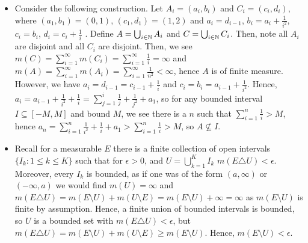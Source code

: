 \documentclass[a4paper]{article}
\begin{document}
\begin{solution}[27]
\begin{itemize}
	\item Consider the following construction. Let \(A_{i} = \left( a_{i}, b_{i} \right) \) and \(C_{i} = \left( c_{i}, d_{i}  \right) \), where \(\left( a_1, b_1 \right)  = \left( 0, 1 \right) \), \(\left( c_1, d_1 \right) = \left( 1, 2 \right) \)  and \(a_{i} = d_{i-1}\), \(b_{i} = a_{i} + \frac{1}{i^2}\),  \(c_{i} = b_{i}\), \(d_{i} = c_{i} + \frac{1}{i}\) . Define \(A = \bigcup_{i \in \mathbb{N}} A_{i}\) and \(C = \bigcup_{i \in \mathbb{N}} C_{i}\). Then, note all \(A_{i}\) are disjoint and all \(C_{i}\) are disjoint. Then, we see \(m\left( C \right)  = \sum_{i= 1}^{\infty} m\left( C_{i} \right) = \sum_{i= 1}^{\infty} \frac{1}{i} = \infty \) and \(m\left( A \right)  = \sum_{i= 1}^{\infty} m\left( A_{i} \right) = \sum_{i= 1}^{\infty} \frac{1}{n^2} < \infty \), hence \(A\) is of finite measure. However, we have \(a_{i} = d_{i-1} = c_{i-1} + \frac{1}{i}\) and \(c_{i} = b_{i} = a_{i-1} + \frac{1}{i^2} \). Hence, \(a_{i} = a_{i-1} + \frac{1}{i^2} + \frac{1}{i} = \sum_{j= 1}^{i}\frac{1}{j} + \frac{1}{j^2} + a_1\), so for any bounded interval \(I \subseteq \left[ -M, M \right] \) and bound \(M\), we see there is a \(n\) such that \(\sum_{i= 1}^{n} \frac{1}{i} > M\), hence \( a_{n} = \sum_{i= 1}^{n} \frac{1}{i^2} + \frac{1}{i} + a_1 > \sum_{i= 1}^{n} \frac{1}{i} > M\), so \(A \nsubseteq I\).
	\item Recall for a measurable \(E\) there is a finite collection of open intervals \(\{I_{k} : 1 \le k \le K\} \) such that for \(\epsilon > 0\), and \(U = \bigcup_{k=1} ^{K} I_{k} \)  \(m\left( E \triangle U \right) < \epsilon \). Moreover, every \(I_{k}\) is bounded, as if one was of the form \(\left( a, \infty \right) \)  or \((-\infty, a)\) we would find \(m\left( U \right) = \infty\) and \(m\left( E \triangle U \right)  = m\left( E \setminus U \right)  + m\left( U \setminus E \right)  = m\left( E \setminus U \right)  + \infty = \infty\) as \(m\left( E \setminus U \right) \) is finite by assumption. Hence, a finite union of bounded intervals is bounded, so \(U\) is a bounded set with \(m\left( E \triangle U \right) < \epsilon\), but \(m \left( E \triangle U \right)  = m\left( E \setminus U \right)  + m\left( U \setminus E \right) \ge m\left( E \setminus U  \right)  \). Hence, \(m\left( E \setminus U \right)  < \epsilon\).
\end{itemize}
\end{solution}
\newpage
\end{document}
